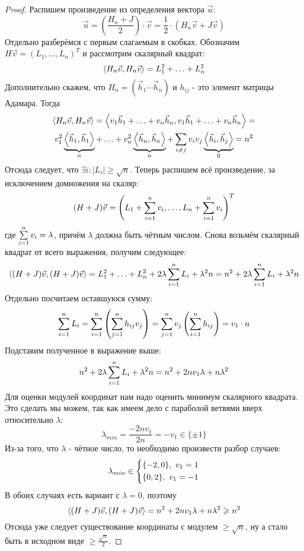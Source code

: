 \begin{enumerate}
\begin{proof}
		Распишем произведение из определения вектора $\vec{u}$:
		\[
			\vec{u} = \left(\frac{H_n + J}{2}\right) \cdot \vec{v} = \frac{1}{2} \cdot (H_n \vec{v} + J \vec{v})
		\]
		Отдельно разберёмся с первым слагаемым в скобках. Обозначим $H\vec{v} = (L_1, \ldots, L_n)^T$ и рассмотрим скалярный квадрат:
		\[
			\left\langle H_n \vec{v}, H_n \vec{v} \right\rangle = L_1^2 + \ldots + L_n^2
		\]
		Дополнительно скажем, что $H_n = (\vec{h}_1 \cdots \vec{h}_n)$ и $h_{ij}$ - это элемент матрицы Адамара. Тогда
		\begin{multline*}
			\left\langle H_n \vec{v}, H_n \vec{v} \right\rangle = \left\langle v_1\vec{h}_1 + \ldots + v_n\vec{h}_n, v_1\vec{h}_1 + \ldots + v_n\vec{h}_n \right\rangle =
			\\
			v_1^2 \underbrace{\left\langle \vec{h}_1, \vec{h}_1 \right\rangle}_{n} + \ldots + v_n^2 \underbrace{\left\langle \vec{h}_n, \vec{h}_n \right\rangle}_{n} + \sum\limits_{i \neq j} v_i v_j \underbrace{\left\langle \vec{h}_i, \vec{h}_j \right\rangle}_{0} = n^2
		\end{multline*}
		Отсюда следует, что $\exists i \colon |L_i| \ge \sqrt{n}$. Теперь распишем всё произведение, за исключением домножения на скаляр:
		\[
			(H + J)\vec{v} = \left(L_1 + \sum\limits_{i = 1}^n v_i, \ldots, L_n + \sum\limits_{i = 1}^n v_i\right)^T
		\]
		где $\sum\limits_{i = 1}^n v_i = \lambda$, причём $\lambda$ должна быть чётным числом. Снова возьмём скалярный квадрат от всего выражения, получим следующее:
		\[
			\left\langle (H + J)\vec{v}, (H + J)\vec{v} \right\rangle = L_1^2 + \ldots + L_n^2 + 2\lambda \sum\limits_{i = 1}^n L_i + \lambda^2 n = n^2 + 2\lambda \sum\limits_{i = 1}^n L_i + \lambda^2 n
		\]
		Отдельно посчитаем оставшуюся сумму:
		\[
			\sum\limits_{i = 1}^n L_i = \sum\limits_{i = 1}^n \left(\sum\limits_{j = 1}^n h_{ij} v_j\right) = \sum\limits_{j = 1}^n v_j \left(\sum\limits_{i = 1}^n h_{ij}\right) = v_1 \cdot n
		\]
		Подставим полученное в выражение выше:
		\[
			n^2 + 2\lambda \sum\limits_{i = 1}^n L_i + \lambda^2 n = n^2 + 2nv_1 \lambda + n\lambda^2
		\]
		Для оценки модулей координат нам надо оценить минимум скалярного квадрата. Это сделать мы можем, так как имеем дело с параболой ветвями вверх относительно $\lambda$:
		\[
			\lambda_{min} = \frac{-2nv_1}{2n} = -v_1 \in \{\pm 1\}
		\]
		Из-за того, что $\lambda$ - чётное число, то необходимо произвести разбор случаев:
		\[
			\lambda_{min} \in \left\{\begin{aligned}
				&{\{-2, 0\},\ v_1 = 1}
				\\
				&{\{0, 2\},\ v_1 = -1}
			\end{aligned}\right.
		\]
		В обоих случаях есть вариант с $\lambda = 0$, поэтому
		\[
			\left\langle (H + J)\vec{v}, (H + J)\vec{v} \right\rangle = n^2 + 2nv_1\lambda + n\lambda^2 \geqslant n^2
		\]
		Отсюда уже следует существование координаты с модулем $\ge \sqrt{n}$, ну а стало быть в исходном виде $\ge \frac{\sqrt{n}}{2}$.
	\end{proof}
	

\end{enumerate}
